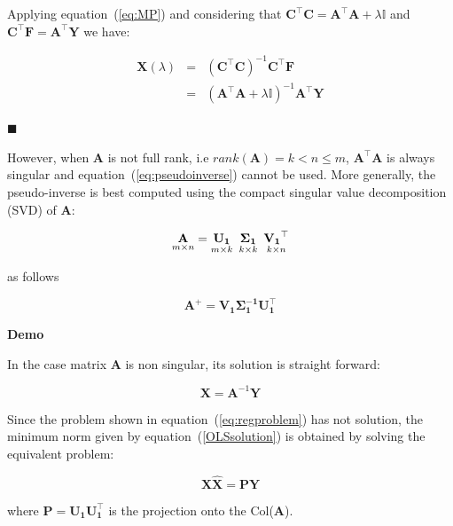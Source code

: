 Applying equation~(\ref{eq:MP}) and considering that $\mathbf{C}^\top
\mathbf{C} = \mathbf{A}^\top \mathbf{A} + \lambda \mathbb{I}$ and 
$\mathbf{C}^\top \mathbf{F}=\mathbf{A}^\top \mathbf{Y} $ we have:

\begin{eqnarray*}
\mathbf{X}(\lambda)&=&(\mathbf{C}^\top
\mathbf{C})^{-1}\mathbf{C}^\top \mathbf{F} \\
&=& (\mathbf{A}^\top \mathbf{A} + \lambda \mathbb{I})^{-1} \mathbf{A}^\top \mathbf{Y}
\end{eqnarray*}

$\blacksquare$


However, when $\mathbf{A}$ is not full rank, i.e
$rank(\mathbf{A})=k <  n \leq m$, $\mathbf{A}^\top \mathbf{A}$ is
always singular and equation~(\ref{eq:pseudoinverse}) cannot be used.
More generally, the pseudo-inverse is best computed using the compact
singular value decomposition (SVD) of $\mathbf{A}$:

\begin{equation}
    \label{eq:compactsvd}
    \underset{m \times n}{\mathbf{A}}=
    \underset{m \times k}{\mathbf{U_1}} \enskip
    \underset{k \times k}{\mathbf{\Sigma_1}} \enskip
    \underset{k \times n}{\mathbf{V_1}^\top}
\end{equation}

\noindent as follows

\begin{equation}
\label{eq:pseudoinversesvd}
\mathbf{A}^+ = \mathbf{V_1\Sigma_1^{-1}U_1^\top}
\end{equation}

\textbf{Demo}\quad

In the case matrix $\mathbf{A}$ is non singular, its solution is
straight forward:

\begin{equation}
\label{OLSsolution}
    \mathbf{\mathbf{X}}=\mathbf{A}^{-1}\mathbf{Y}
\end{equation}


Since the problem shown in equation~(\ref{eq:regproblem}) has not
solution, the minimum norm given by equation~(\ref{OLSsolution}) is
obtained by solving the equivalent problem:

\begin{equation*}
\label{eq:proyectorsol}
\mathbf{X \hat{\mathbf{X}} = PY} 
\end{equation*}


\noindent where $\mathbf{P=U_1 U_1^\top}$ is the projection onto the
Col($\mathbf{A}$). 

